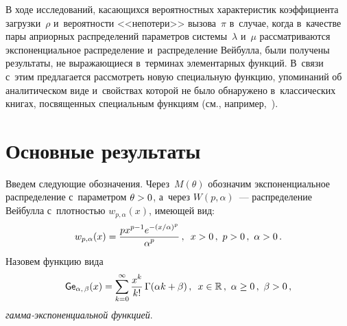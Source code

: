 \begin{multicols}{2}
В ходе исследований, касающихся вероятностных характеристик коэффициента 
загрузки~$\rho$  и~вероятности <<непотери>> вызова~$\pi$ в~случае, когда в~качестве 
пары априорных распределений параметров системы~$\lambda$ и~$\mu$ 
рассматриваются экспоненциальное распределение и~распределение Вейбулла, 
были получены результаты, не выражающиеся в~терминах элементарных функций. 
В~связи с~этим предлагается рассмотреть новую специальную функцию, 
упоминаний об аналитическом виде и~свойствах которой не было 
обнаружено в~классических книгах, посвященных специальным функциям 
(см., например,~\cite{Artin, BeEr,AbSt}).

\section{Основные результаты}


Введем следующие обозначения. Через~$M(\theta)$ обозначим экспоненциальное 
распределение с~параметром $\theta\hm>0$, а~через $W(p,\alpha)$~--- 
распределение Вейбулла с~плот\-ностью $w_{p,\alpha}(x)$, имеющей вид:
$$
w_{p,\alpha}(x) = \displaystyle\frac{\displaystyle px^{p-1}e^{-({x/\alpha})^p}\mathstrut}{\displaystyle \alpha^{p}\mathstrut} \,, \enskip
 x>0\,,\  p>0\,,\ \alpha>0\,.
 $$
Назовем функцию вида
$$
{\sf Ge}_{\alpha,\, \beta} (x) = \sum\limits_{k=0}^{\infty}
\displaystyle\frac{\displaystyle x^k\mathstrut}{\displaystyle k!\mathstrut}\, \Gamma(\alpha k + \beta)\,, \enskip
 x\in\mathbb{R}\,, \ \alpha\ge0\,, \  \beta> 0\,,
 $$
\textit{гамма-экспо\-нен\-ци\-аль\-ной функцией}.


\smallskip


\end{multicols}
